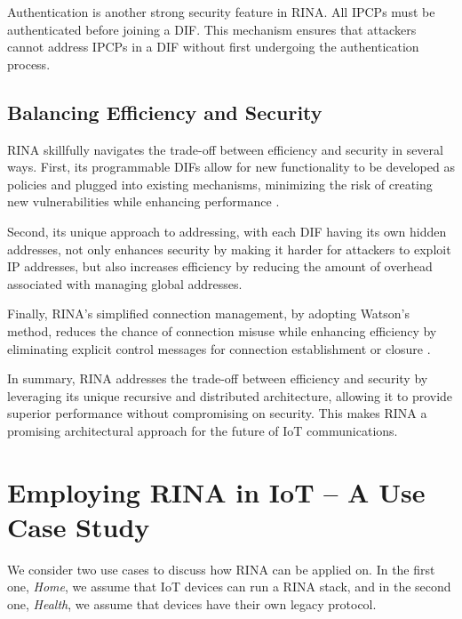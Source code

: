 \documentclass{ieeeaccess}
\begin{document}
Authentication is another strong security feature in RINA. All IPCPs must be authenticated before joining a DIF. This mechanism ensures that attackers cannot address IPCPs in a DIF without first undergoing the authentication process.

\subsection{Balancing Efficiency and Security}

RINA skillfully navigates the trade-off between efficiency and security in several ways. First, its programmable DIFs allow for new functionality to be developed as policies and plugged into existing mechanisms, minimizing the risk of creating new vulnerabilities while enhancing performance \cite{small2012}.

Second, its unique approach to addressing, with each DIF having its own hidden addresses, not only enhances security by making it harder for attackers to exploit IP addresses, but also increases efficiency by reducing the amount of overhead associated with managing global addresses.

Finally, RINA's simplified connection management, by adopting Watson's method, reduces the chance of connection misuse while enhancing efficiency by eliminating explicit control messages for connection establishment or closure \cite{boddapati2012assessing}.

In summary, RINA addresses the trade-off between efficiency and security by leveraging its unique recursive and distributed architecture, allowing it to provide superior performance without compromising on security. This makes RINA a promising architectural approach for the future of IoT communications.


\section{Employing RINA in IoT -- A Use Case Study}
\label{sec:usecases}

We consider two use cases to discuss how RINA can be applied on. In the first one, \textit{Home}, we assume that IoT devices can run a RINA stack, and in the second one, \textit{Health}, we assume that devices have their own legacy protocol.
\end{document}
